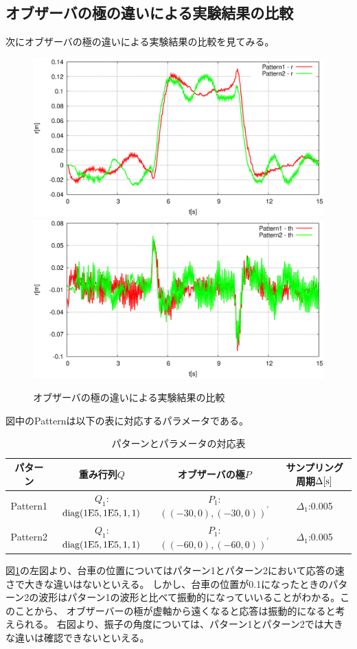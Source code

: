 	\subsection{オブザーバの極の違いによる実験結果の比較}
	次にオブザーバの極の違いによる実験結果の比較を見てみる。
	\begin{figure}[H]
		\centering
		\includegraphics[width=0.49\linewidth]{gazo/Compare_obs_R2.eps}
		\includegraphics[width=0.49\linewidth]{gazo/Compare_obs_TH2.eps}
		\caption{オブザーバの極の違いによる実験結果の比較}
		\label{image:comp_obs}
	\end{figure}
	図中のPatternは以下の表に対応するパラメータである。
	\begin{table}[H]
		\begin{center}
			\caption{パターンとパラメータの対応表}
			\medskip
			
			\begin{tabular}{|c|c|c|c|}\hline
				パターン & 重み行列$Q$ & オブザーバの極$P$ & サンプリング周期$\Delta[\rm{s}]$ \\ \hline\hline
				Pattern1 & $Q_1$:$\rm{diag}(1E5,1E5,1,1)$ & $P_1$:$((-30,0),(-30,0))^{'}$ & $\Delta_1$:0.005 \\ \hline
				Pattern2 & $Q_1$:$\rm{diag}(1E5,1E5,1,1)$ & $P_1$:$((-60,0),(-60,0))^{'}$ & $\Delta_1$:0.005 \\ \hline
			\end{tabular}
		\end{center}
		\label{table:huriage_control}
	\end{table}
	図\ref{image:comp_obs}の左図より、台車の位置についてはパターン1とパターン2において応答の速さで大きな違いはないといえる。
	しかし、台車の位置が0.1になったときのパターン2の波形はパターン1の波形と比べて振動的になっていいることがわかる。このことから、
	オブザーバーの極が虚軸から遠くなると応答は振動的になると考えられる。
	右図より、振子の角度については、パターン1とパターン2では大きな違いは確認できないといえる。
	\newpage
